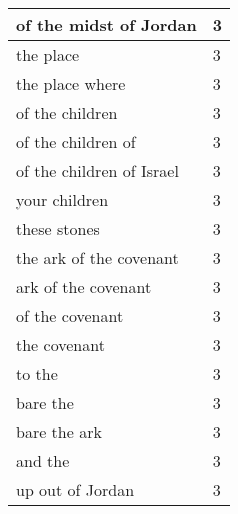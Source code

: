 \begin{center}
\begin{longtable}{|p{3.0in}|p{0.5in}|}
of the midst of Jordan & 3\\ \hline 
the place & 3\\ \hline 
the place where & 3\\ \hline 
of the children & 3\\ \hline 
of the children of & 3\\ \hline 
of the children of Israel & 3\\ \hline 
your children & 3\\ \hline 
these stones & 3\\ \hline 
the ark of the covenant & 3\\ \hline 
ark of the covenant & 3\\ \hline 
of the covenant & 3\\ \hline 
the covenant & 3\\ \hline 
to the & 3\\ \hline 
bare the & 3\\ \hline 
bare the ark & 3\\ \hline 
and the & 3\\ \hline 
up out of Jordan & 3\\ \hline 
\end{longtable}
\end{center}





